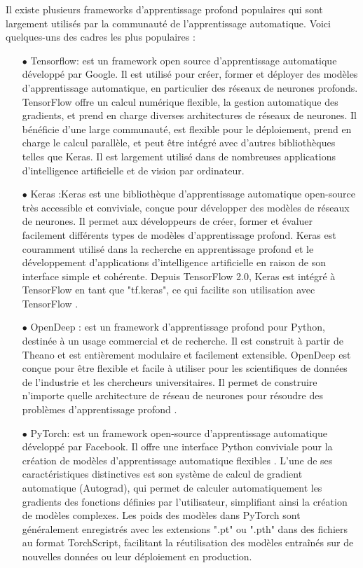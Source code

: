 Il existe plusieurs frameworks d'apprentissage profond populaires qui sont largement utilisés par la communauté de l'apprentissage automatique. Voici quelques-uns des cadres les plus populaires :
\begin{itemize}
    \item [$\bullet$] Tensorflow: est un framework open source d'apprentissage automatique développé par Google. Il est utilisé pour créer, former et déployer des modèles d'apprentissage automatique, en particulier des réseaux de neurones profonds. TensorFlow offre un calcul numérique flexible, la gestion automatique des gradients, et prend en charge diverses architectures de réseaux de neurones. Il bénéficie d'une large communauté, est flexible pour le déploiement, prend en charge le calcul parallèle, et peut être intégré avec d'autres bibliothèques telles que Keras. Il est largement utilisé dans de nombreuses applications d'intelligence artificielle et de vision par ordinateur\cite{ch3_TensorFlow}.
    \item [$\bullet$] Keras :Keras est une bibliothèque d'apprentissage automatique open-source très accessible et conviviale, conçue pour développer des modèles de réseaux de neurones. Il permet aux développeurs de créer, former et évaluer facilement différents types de modèles d'apprentissage profond. Keras est couramment utilisé dans la recherche en apprentissage profond et le développement d'applications d'intelligence artificielle en raison de son interface simple et cohérente. Depuis TensorFlow 2.0, Keras est intégré à TensorFlow en tant que "tf.keras", ce qui facilite son utilisation avec TensorFlow \cite{ch3_KerasDee40}.
     \item [$\bullet$] OpenDeep : est un framework d'apprentissage profond pour Python, destinée à un usage commercial et de recherche. Il est construit à partir de Theano et est entièrement modulaire et facilement extensible. OpenDeep est conçue pour être flexible et facile à utiliser pour les scientifiques de données de l'industrie et les chercheurs universitaires. Il permet de construire n'importe quelle architecture de réseau de neurones pour résoudre des problèmes d'apprentissage profond \cite{ch3_opendeep}. 
    \item [$\bullet$] PyTorch: est un framework open-source d'apprentissage automatique développé par Facebook. Il offre une interface Python conviviale pour la création de modèles d'apprentissage automatique flexibles \cite{datascientest-pytorch}. L'une de ses caractéristiques distinctives est son système de calcul de gradient automatique (Autograd), qui permet de calculer automatiquement les gradients des fonctions définies par l'utilisateur, simplifiant ainsi la création de modèles complexes. Les poids des modèles dans PyTorch sont généralement enregistrés avec les extensions ".pt" ou ".pth" dans des fichiers au format TorchScript, facilitant la réutilisation des modèles entraînés sur de nouvelles données ou leur déploiement en production.

\end{itemize}

